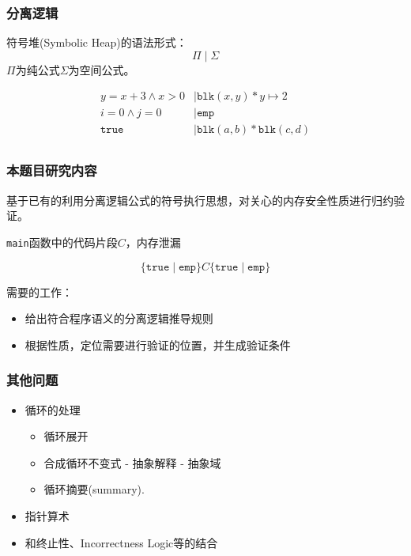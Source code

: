 \documentclass[aspectratio=1610, 11pt]{beamer}
\begin{document}
\begin{frame}\frametitle{分离逻辑}
\begin{definition}[符号堆]
符号堆(Symbolic Heap)的语法形式：
\[\Pi \mid \Sigma \]
$\Pi$为纯公式$\Sigma$为空间公式。
\end{definition}
\begin{example}
\begin{align*}
y = x + 3 \wedge x > 0 &\mid \texttt{blk}(x, y)* y\mapsto 2\\
 i = 0\wedge j = 0 &\mid \texttt{emp}\\
\texttt{true}&\mid \texttt{blk}(a,b) * \texttt{blk}(c,d)\\
\end{align*}
\end{example}
\end{frame}

\begin{frame}\frametitle{本题目研究内容}
基于已有的利用分离逻辑公式的符号执行思想，对关心的内存安全性质进行归约验证。
\begin{example}
\texttt{main}函数中的代码片段$C$，内存泄漏

\[\{\texttt{true}\mid \texttt{emp}\} C \{\texttt{true}\mid \texttt{emp}\}\]
\end{example}
需要的工作：
\begin{itemize}
\item 给出符合程序语义的分离逻辑推导规则
\item 根据性质，定位需要进行验证的位置，并生成验证条件
\end{itemize}
\end{frame}

\begin{frame}\frametitle{}

\end{frame}


\begin{frame}\frametitle{其他问题}
\begin{itemize}
\item 循环的处理
\begin{itemize}
\item 循环展开
\item 合成循环不变式 - 抽象解释 - 抽象域 
\item 循环摘要(summary).
\end{itemize}
\item 指针算术
\item 和终止性、Incorrectness Logic等的结合
\end{itemize}
\end{frame}
\end{document}
